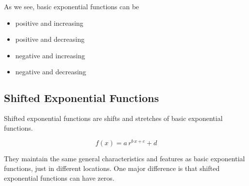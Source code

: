 \documentclass{ximera}
\begin{document}
As we see, basic exponential functions can be

\begin{itemize}
\item positive and increasing
\item positive and decreasing
\item negative and increasing
\item negative and decreasing
\end{itemize}




















\subsection{Shifted Exponential Functions}


Shifted exponential functions are shifts and stretches of basic exponential functions.  


\[
f(x) = a \, r^{b \, x + c} + d
\]



They maintain the same general characteristics and features as basic exponential functions, just in different locations. One major difference is that shifted exponential functions can have zeros.
\end{document}

